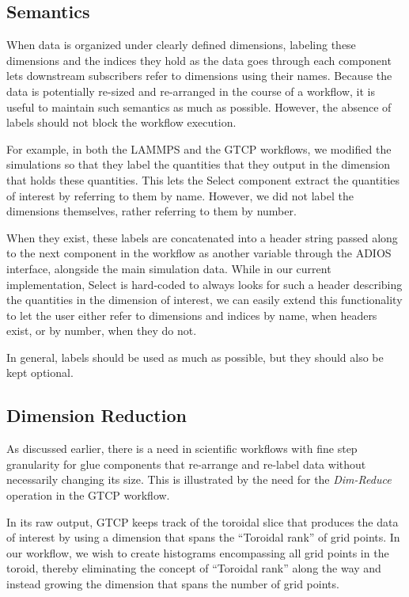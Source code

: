 \subsection{Semantics}

When data is organized under clearly defined
dimensions, labeling these
dimensions and the indices they hold
as the data goes through each component
lets downstream subscribers
refer to dimensions using their names.
Because the data is potentially re-sized
and re-arranged in the course of a workflow,
it is useful to maintain such
semantics as much as possible. However,
the absence of labels should not block
the workflow execution.

For example, in both the LAMMPS and the GTCP workflows, we modified
the simulations so that they label the
quantities that they output in the
dimension that holds
these quantities. This lets the Select component
extract the quantities of interest by referring
to them by name. However, we did not label the dimensions
themselves, rather referring to them by number. 

When they exist, these labels are concatenated
into a header string passed along to the
next component in the workflow as another variable
through the ADIOS interface, alongside the main
simulation data.
While in our current implementation, Select is hard-coded to
always looks for such a header describing the quantities
in the dimension of interest, 
we can easily extend this functionality to let the user either refer
to dimensions and indices by name, when headers exist, or by number,
when they do not.

In general, labels should be used as much as possible, but they
should also be kept optional.

\subsection{Dimension Reduction}
\label{subsec:dimreduce}
As discussed earlier, there is a need in
scientific workflows with fine
step granularity for glue components
that re-arrange and re-label data
without necessarily changing its size.
This is illustrated by the need for the {\em Dim-Reduce}
operation in the GTCP workflow.

In its raw output, GTCP keeps track of the
toroidal slice that produces the data of interest by using a
dimension that spans the ``Toroidal rank'' of grid points.
In our workflow, we
wish to create histograms encompassing all grid
points in the toroid, thereby
eliminating the concept of ``Toroidal rank''
along the way
and instead growing the dimension
that spans the number of grid points.

